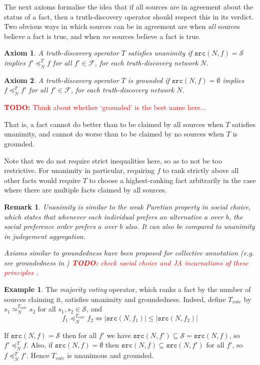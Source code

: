 \documentclass{article}
\theoremstyle{definition} \newtheorem{definition}{Definition}
\theoremstyle{definition} \newtheorem{example}{Example}
\theoremstyle{plain} \newtheorem{axiom}{Axiom}
\theoremstyle{plain} \newtheorem*{remark}{Remark}
\theoremstyle{remark} \newtheorem*{notation}{Notation}
\theoremstyle{plain} \newtheorem{lemma}{Lemma}
\theoremstyle{plain} \newtheorem{proposition}{Proposition}
\newcommand{\todo}[1] {
    \textcolor{red}{
        \textbf{TODO:} #1
    }
}
\renewcommand{\S}{\mathcal{S}}  %
\newcommand{\F}{\mathcal{F}}
\newcommand{\seq}{\simeq}
\newcommand{\fle}{\preceq}
\newcommand{\src}{\texttt{src}}
\begin{document}
The next axioms formalise the idea that if all sources are in agreement about
the status of a fact, then a truth-discovery operator should respect this in
its verdict. Two obvious ways in which sources can be in agreement are when
\emph{all} sources believe a fact is true, and when \emph{no} sources believe a
fact is true.

\begin{axiom}
A truth-discovery operator $T$ satisfies \emph{unanimity} if $\src(N, f) = \S$
implies $f' \fle_N^T f$ for all $f' \in \F$, for each truth-discovery network
$N$.
\end{axiom}

\begin{axiom}
A truth-discovery operator $T$ is \emph{grounded} if $\src(N, f) = \emptyset$
implies $f \fle_N^T f'$ for all $f' \in \F$, for each truth-discovery network
$N$.
\end{axiom}

\todo{Think about whether `grounded' is the best name here...}

That is, a fact cannot do better than to be claimed by all sources when $T$
satisfies unanimity, and cannot do worse than to be claimed by no sources when
$T$ is grounded.

Note that we do not require strict inequalities here, so as to not be too
restrictive. For unanimity in particular, requiring $f$ to rank strictly above
all other facts would require $T$ to choose a highest-ranking fact arbitrarily
in the case where there are multiple facts claimed by all sources.

\begin{remark}
Unanimity is similar to the \emph{weak Paretian}
property\cite{create_the_citation...} in social choice, which states that
whenever each individual prefers an alternative $a$ over $b$, the social
preference order prefers $a$ over $b$ also. It can also be compared to
unanimity in judegement aggregation\cite{handbook_ja}.

Axioms similar to groundedness have been proposed for collective annotation
(e.g. see \emph{groundedness} in \cite{kruger}) \todo{check social choice and
JA incarnations of these principles}.
\end{remark}

\begin{example}
The \emph{majority voting} operator, which ranks a fact by the number of
sources claiming it, satisfies unanimity and groundedness. Indeed, define
$T_{vote}$ by $s_1 \seq_N^{T_{vote}} s_2$ for all $s_1, s_2 \in \S$, and
    $$ f_1 \fle_N^{T_{vote}} f_2 \iff |\src(N, f_1)| \le |\src(N, f_2)| $$

If $\src(N, f) = \S$ then for all $f'$ we have $\src(N, f') \subseteq \S =
\src(N, f)$, so $f' \fle_N^T f$. Also, if $\src(N, f) = \emptyset$ then
$\src(N, f) \subseteq \src(N, f')$ for all $f'$, so $f \fle_N^T f'$. Hence
$T_{vote}$ is unanimous and grounded.
\end{example}
\end{document}
